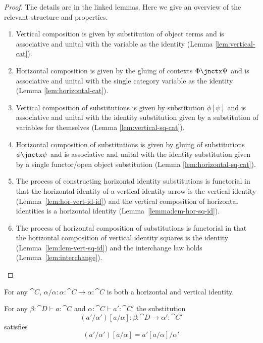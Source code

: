 \begin{proof}
  The details are in the linked lemmas. Here we give an overview of
  the relevant structure and properties.
  \begin{enumerate}
  \item Vertical composition is given by substitution of object terms
    and is associative and unital with the variable as the identity
    (Lemma \ref{lem:vertical-cat}).
  \item Horizontal composition is given by the gluing of contexts
    $\Phi\jnctx \Psi$ and is associative and unital with the single
    category variable as the identity (Lemma
    \ref{lem:horizontal-cat}).
  \item Vertical composition of substitutions is given by substitution
    $\phi[\psi]$ and is associative and unital with the identity
    substitution given by a substitution of variables for themselves
    (Lemma \ref{lem:vertical-sq-cat}).
  \item Horizontal composition of substitutions is given by gluing of
    substitutions $\phi \jnctx \psi$ and is associative and unital
    with the identity substitution given by a single functor/open
    object substitution (Lemma \ref{lem:horizontal-sq-cat}).
  \item The process of constructing horizontal identity substitutions
    is functorial in that the horizontal identity of a vertical
    identity arrow is the vertical identity
    (Lemma~\ref{lem:hor-vert-id-id}) and the vertical composition of
    horizontal identities is a horizontal identity
    (Lemma~\ref{lemma:lem-hor-sq-id}).
  \item The process of horizontal composition of substitutions is
    functorial in that the horizontal composition of vertical identity
    squares is the identity (Lemma~\ref{lem:lem-vert-sq-id}) and the
    interchange law holds (Lemma~\ref{lem:interchange}).
  \end{enumerate}
\end{proof}


\begin{lemma}
  \label{lem:sq-vid-hid}
  For any $\cat C$, $\alpha/\alpha : \alpha:\cat C \to \alpha:\cat C$
  is both a horizontal and vertical identity.
\end{lemma}

\begin{lemma}
  \label{lem:sq-vcomp-hid}
  For any $\beta:\cat D \vdash a : \cat C$ and $\alpha:\cat C \vdash a': \cat C'$
  the substitution
  \[ (a'/\alpha')[a/\alpha] : \beta:\cat D \to \alpha':\cat C' \]
  satisfies
  \[ (a'/\alpha')[a/\alpha] = a'[a/\alpha]/\alpha' \]
\end{lemma}

